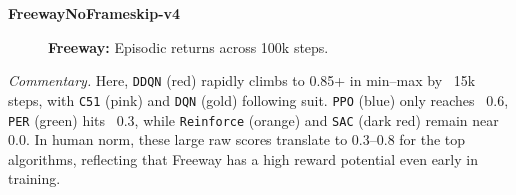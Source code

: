 \noindent
\textbf{FreewayNoFrameskip-v4}
\begin{figure}[htbp]
	\centering
	\quad
	\caption{\textbf{Freeway:} Episodic returns across 100k steps.}
	\label{fig:freeway_comparison_combined}
\end{figure}

\noindent
\emph{Commentary.}
Here, \texttt{DDQN} (red) rapidly climbs to 0.85+ in min--max by ~15k steps, 
with \texttt{C51} (pink) and \texttt{DQN} (gold) following suit. 
\texttt{PPO} (blue) only reaches ~0.6, 
\texttt{PER} (green) hits ~0.3, while \texttt{Reinforce} (orange) and \texttt{SAC} (dark red) 
remain near 0.0. 
In human norm, these large raw scores translate to 0.3--0.8 for the top algorithms, 
reflecting that Freeway has a high reward potential even early in training.

\bigskip

